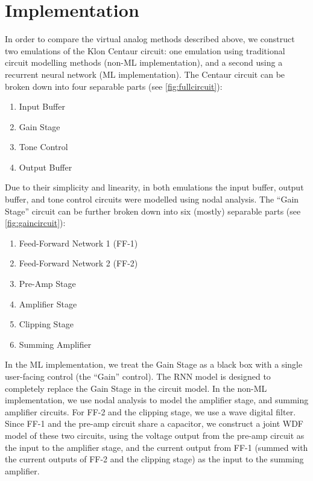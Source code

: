 \documentclass[twoside,a4paper]{article}
\begin{document}
\section{Implementation}
In order to compare the virtual analog methods described above,
we construct two emulations of the Klon Centaur circuit: one emulation
using traditional circuit modelling methods (non-ML implementation), and
a second using a recurrent neural network (ML implementation). The Centaur
circuit can be broken down into four separable parts (see \cref{fig:fullcircuit}):
\begin{enumerate}
    \item Input Buffer
    \item Gain Stage
    \item Tone Control
    \item Output Buffer
\end{enumerate}
%
Due to their simplicity and linearity, in both emulations the input
buffer, output buffer, and tone control circuits were modelled using
nodal analysis. The ``Gain Stage'' circuit can be further broken down
into six (mostly) separable parts (see \cref{fig:gaincircuit}):
\begin{enumerate}
    \item Feed-Forward Network 1 (FF-1)
    \item Feed-Forward Network 2 (FF-2)
    \item Pre-Amp Stage
    \item Amplifier Stage
    \item Clipping Stage
    \item Summing Amplifier
\end{enumerate}
%
In the ML implementation, we treat the Gain Stage as a black box
with a single user-facing control (the ``Gain'' control). The RNN
model is designed to completely replace the Gain Stage in the circuit
model. In the non-ML implementation, we use nodal analysis to
model the amplifier stage, and summing amplifier circuits.
For FF-2 and the clipping stage, we use a wave digital filter.
Since FF-1 and the pre-amp circuit share a capacitor, we construct
a joint WDF model of these two circuits, using the voltage output
from the pre-amp circuit as the input to the amplifier stage, and
the current output from FF-1 (summed with the current outputs of
FF-2 and the clipping stage) as the input to the summing amplifier.
%
\end{document}
